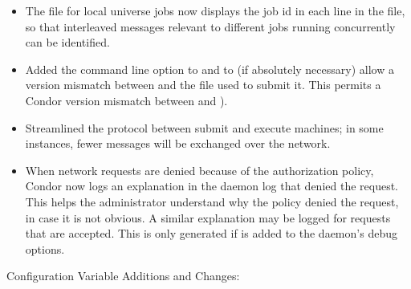 \begin{itemize}
\item The  file for local universe jobs now displays the job id
in each line in the file, so that interleaved messages relevant to
different jobs running concurrently can be identified.

\item Added the  command line option to
 and  to (if absolutely necessary)
allow a version mismatch between  and the
 file used to submit it.
This permits a Condor version mismatch between
 and ).

\item Streamlined the protocol between submit and execute machines; in some
instances, fewer messages will be exchanged over the network.

\item When network requests are denied because of the authorization
policy, Condor now logs an explanation in the daemon log that denied
the request.  This helps the administrator understand why the policy
denied the request, in case it is not obvious.  A similar explanation
may be logged for requests that are accepted.  This is only generated
if  is added to the daemon's debug options.

\end{itemize}

\noindent Configuration Variable Additions and Changes:

